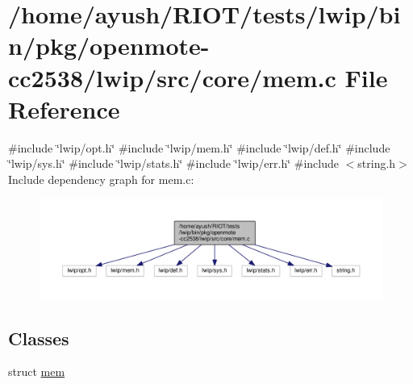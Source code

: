 \hypertarget{openmote-cc2538_2lwip_2src_2core_2mem_8c}{}\section{/home/ayush/\+R\+I\+O\+T/tests/lwip/bin/pkg/openmote-\/cc2538/lwip/src/core/mem.c File Reference}
\label{openmote-cc2538_2lwip_2src_2core_2mem_8c}
{\ttfamily \#include \char`\"{}lwip/opt.\+h\char`\"{}}\newline
{\ttfamily \#include \char`\"{}lwip/mem.\+h\char`\"{}}\newline
{\ttfamily \#include \char`\"{}lwip/def.\+h\char`\"{}}\newline
{\ttfamily \#include \char`\"{}lwip/sys.\+h\char`\"{}}\newline
{\ttfamily \#include \char`\"{}lwip/stats.\+h\char`\"{}}\newline
{\ttfamily \#include \char`\"{}lwip/err.\+h\char`\"{}}\newline
{\ttfamily \#include $<$string.\+h$>$}\newline
Include dependency graph for mem.\+c\+:
\nopagebreak
\begin{figure}[H]
\begin{center}
\leavevmode
\includegraphics[width=350pt]{openmote-cc2538_2lwip_2src_2core_2mem_8c__incl}
\end{center}
\end{figure}
\subsection*{Classes}
\begin{DoxyCompactItemize}
\item 
struct \hyperlink{structmem}{mem}
\end{DoxyCompactItemize}
